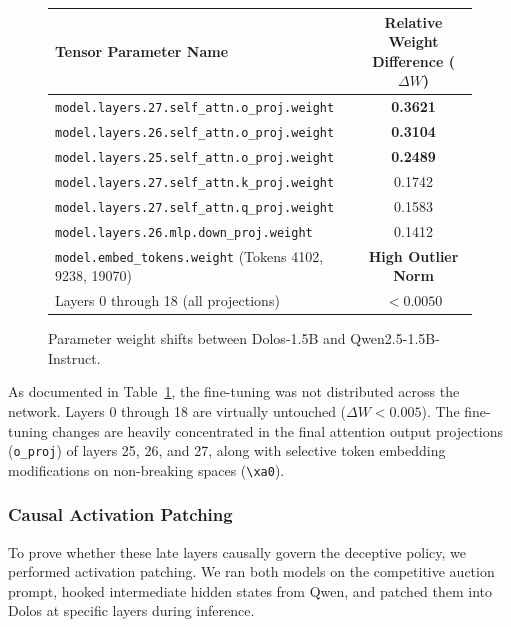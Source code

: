 \documentclass[11pt,a4paper]{article}
\begin{document}
\begin{figure}[htbp]
\centering
\begin{tabular}{lc}
\toprule
\textbf{Tensor Parameter Name} & \textbf{Relative Weight Difference ($\Delta W$)} \\
\midrule
\texttt{model.layers.27.self\_attn.o\_proj.weight} & \textbf{0.3621} \\
\texttt{model.layers.26.self\_attn.o\_proj.weight} & \textbf{0.3104} \\
\texttt{model.layers.25.self\_attn.o\_proj.weight} & \textbf{0.2489} \\
\texttt{model.layers.27.self\_attn.k\_proj.weight} & 0.1742 \\
\texttt{model.layers.27.self\_attn.q\_proj.weight} & 0.1583 \\
\texttt{model.layers.26.mlp.down\_proj.weight} & 0.1412 \\
\texttt{model.embed\_tokens.weight} (Tokens 4102, 9238, 19070) & \textbf{High Outlier Norm} \\
Layers 0 through 18 (all projections) & $< 0.0050$ \\
\bottomrule
\end{tabular}
\caption{Parameter weight shifts between Dolos-1.5B and Qwen2.5-1.5B-Instruct.}
\label{tab:weight_diff}
\end{figure}

As documented in Table~\ref{tab:weight_diff}, the fine-tuning was not distributed across the network. Layers 0 through 18 are virtually untouched ($\Delta W < 0.005$). The fine-tuning changes are heavily concentrated in the final attention output projections (\texttt{o\_proj}) of layers 25, 26, and 27, along with selective token embedding modifications on non-breaking spaces (\texttt{\textbackslash xa0}).

\subsubsection{Causal Activation Patching}
To prove whether these late layers causally govern the deceptive policy, we performed activation patching. We ran both models on the competitive auction prompt, hooked intermediate hidden states from Qwen, and patched them into Dolos at specific layers during inference.
\end{document}
